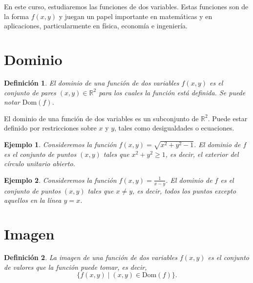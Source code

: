 \documentclass[11pt]{book}
\theoremstyle{definicion}
\theoremstyle{teorema}
\theoremstyle{ejemplo}
\newtheorem{definition}{Definición}
\newtheorem{example}{Ejemplo}
\begin{document}




En este curso, estudiaremos las funciones de dos variables. Estas funciones son de la forma \( f(x, y) \) y juegan un papel importante en matemáticas y en aplicaciones, particularmente en física, economía e ingeniería.

\section{Dominio}
\begin{definition}
El dominio de una función de dos variables \( f(x, y) \) es el conjunto de pares \((x, y) \in \mathbb{R}^2\) para los cuales la función está definida. Se puede notar $\mathrm{Dom}(f)$.
\end{definition}

El dominio de una función de dos variables es un subconjunto de \(\mathbb{R}^2\). Puede estar definido por restricciones sobre \(x\) y \(y\), tales como desigualdades o ecuaciones.

\begin{example}
Consideremos la función \( f(x, y) = \sqrt{x^2 + y^2 - 1} \). El dominio de \( f \) es el conjunto de puntos \((x, y)\) tales que \(x^2 + y^2  \geq 1\), es decir, el exterior del círculo unitario abierto.
\end{example}

\begin{example}
Consideremos la función \( f(x, y) = \frac{1}{x - y} \). El dominio de \( f \) es el conjunto de puntos \((x, y)\) tales que \(x \neq y\), es decir, todos los puntos excepto aquellos en la línea \(y = x\).
\end{example}

\section{Imagen}
\begin{definition}
La imagen de una función de dos variables \( f(x, y) \) es el conjunto de valores que la función puede tomar, es decir,
\[ \{ f(x, y) \mid (x, y) \in \mathrm{Dom}(f) \}. \]
\end{definition}
\end{document}
